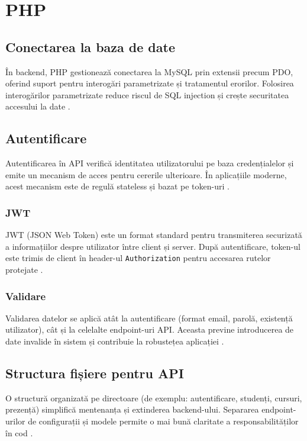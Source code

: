 \section{PHP}

\subsection{Conectarea la baza de date}
În backend, PHP gestionează conectarea la MySQL prin extensii precum PDO, oferind suport pentru interogări parametrizate și tratamentul erorilor. Folosirea interogărilor parametrizate reduce riscul de SQL injection și crește securitatea accesului la date \cite{php_group_2024,oracle_mysql_2024}.

\subsection{Autentificare}
Autentificarea în API verifică identitatea utilizatorului pe baza credențialelor și emite un mecanism de acces pentru cererile ulterioare. În aplicațiile moderne, acest mecanism este de regulă stateless și bazat pe token-uri \cite{php_group_2024,jwt_io_2026}.

\subsubsection{JWT}
JWT (JSON Web Token) este un format standard pentru transmiterea securizată a informațiilor despre utilizator între client și server. După autentificare, token-ul este trimis de client în header-ul \texttt{Authorization} pentru accesarea rutelor protejate \cite{jwt_io_2026}.

\subsubsection{Validare}
Validarea datelor se aplică atât la autentificare (format email, parolă, existență utilizator), cât și la celelalte endpoint-uri API. Aceasta previne introducerea de date invalide în sistem și contribuie la robustețea aplicației \cite{php_group_2024}.

\subsection{Structura fișiere pentru API}
O structură organizată pe directoare (de exemplu: autentificare, studenți, cursuri, prezență) simplifică mentenanța și extinderea backend-ului. Separarea endpoint-urilor de configurații și modele permite o mai bună claritate a responsabilităților în cod \cite{php_group_2024}.

